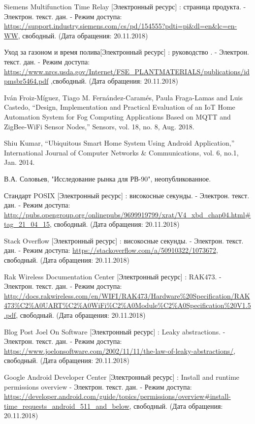 \begin{my_enumerate}
\item Siemens Multifunction Time Relay  [Электронный ресурс] : страница продукта. - Электрон. текст. дан. - Режим доступа:  \url{https://support.industry.siemens.com/cs/pd/154555?pdti=pi&dl=en&lc=en-WW}, свободный. (Дата обращения: 20.11.2018)

\item Уход за газоном и время полива[Электронный ресурс] : руководство . - Электрон. текст. дан. - Режим доступа: \url{https://www.nrcs.usda.gov/Internet/FSE_PLANTMATERIALS/publications/idpmsbr5464.pdf} ,свободный. (Дата обращения: 20.11.2018)

\item Iván Froiz-Míguez, Tiago M. Fernández-Caramés, Paula Fraga-Lamas and Luis Castedo, “Design, Implementation and Practical Evaluation of an IoT Home Automation System for Fog Computing Applications Based on MQTT and ZigBee-WiFi Sensor Nodes,” Sensors, vol. 18, no. 8, Aug. 2018.

\item Shiu Kumar, “Ubiquitous Smart Home System Using Android Application,” International Journal of Computer Networks \& Communications, vol. 6, no.1, Jan. 2014. 

\item В.А. Соловьев, "Исследование рынка для РВ-90", неопубликованное.

\item Стандарт POSIX [Электронный ресурс] : високосные секунды. - Электрон. текст. дан. - Режим доступа: \url{http://pubs.opengroup.org/onlinepubs/9699919799/xrat/V4_xbd_chap04.html#tag_21_04_15}, свободный. (Дата обращения: 20.11.2018)

\item Stack Overflow [Электронный ресурс] : високосные секунды. - Электрон. текст. дан. - Режим доступа: \url{https://stackoverflow.com/a/50910322/1073672}, свободный. (Дата обращения: 20.11.2018)

\item Rak Wireless Documentation Center [Электронный ресурс] : RAK473. - Электрон. текст. дан. - Режим доступа: \url{http://docs.rakwireless.com/en/WIFI/RAK473/Hardware%20Specification/RAK473%C2%A0UART%C2%A0WiFi%C2%A0Module%C2%A0Specification%20V1.5.pdf}, свободный. (Дата обращения: 20.11.2018)

\item Blog Post Joel On Software [Электронный ресурс] : Leaky abstractions. - Электрон. текст. дан. - Режим доступа: \url{https://www.joelonsoftware.com/2002/11/11/the-law-of-leaky-abstractions/}, свободный. (Дата обращения: 20.11.2018)

\item Google Android Developer Center [Электронный ресурс] : Install and runtime permissions overview - Электрон. текст. дан. - Режим доступа: \url{https://developer.android.com/guide/topics/permissions/overview#install-time_requests_android_511_and_below}, свободный. (Дата обращения: 20.11.2018)



\end{my_enumerate}

